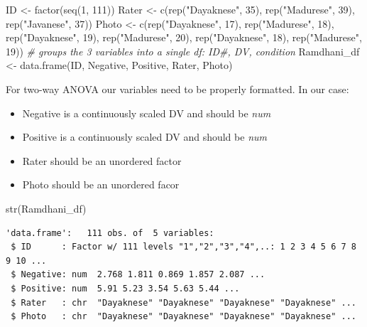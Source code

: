 \documentclass[
  11pt,
]{book}
\newenvironment{Shaded}{\begin{snugshade}}{\end{snugshade}}
\newcommand{\CommentTok}[1]{\textcolor[rgb]{0.56,0.35,0.01}{\textit{#1}}}
\newcommand{\DecValTok}[1]{\textcolor[rgb]{0.00,0.00,0.81}{#1}}
\newcommand{\FunctionTok}[1]{\textcolor[rgb]{0.00,0.00,0.00}{#1}}
\newcommand{\NormalTok}[1]{#1}
\newcommand{\OtherTok}[1]{\textcolor[rgb]{0.56,0.35,0.01}{#1}}
\newcommand{\StringTok}[1]{\textcolor[rgb]{0.31,0.60,0.02}{#1}}
\providecommand{\tightlist}{%
  \setlength{\itemsep}{0pt}\setlength{\parskip}{0pt}}
\begin{document}
\begin{Shaded}
\begin{Highlighting}[]
\NormalTok{ID }\OtherTok{\textless{}{-}} \FunctionTok{factor}\NormalTok{(}\FunctionTok{seq}\NormalTok{(}\DecValTok{1}\NormalTok{, }\DecValTok{111}\NormalTok{))}
\NormalTok{Rater }\OtherTok{\textless{}{-}} \FunctionTok{c}\NormalTok{(}\FunctionTok{rep}\NormalTok{(}\StringTok{"Dayaknese"}\NormalTok{, }\DecValTok{35}\NormalTok{), }\FunctionTok{rep}\NormalTok{(}\StringTok{"Madurese"}\NormalTok{, }\DecValTok{39}\NormalTok{), }\FunctionTok{rep}\NormalTok{(}\StringTok{"Javanese"}\NormalTok{, }\DecValTok{37}\NormalTok{))}
\NormalTok{Photo }\OtherTok{\textless{}{-}} \FunctionTok{c}\NormalTok{(}\FunctionTok{rep}\NormalTok{(}\StringTok{"Dayaknese"}\NormalTok{, }\DecValTok{17}\NormalTok{), }\FunctionTok{rep}\NormalTok{(}\StringTok{"Madurese"}\NormalTok{, }\DecValTok{18}\NormalTok{), }\FunctionTok{rep}\NormalTok{(}\StringTok{"Dayaknese"}\NormalTok{,}
    \DecValTok{19}\NormalTok{), }\FunctionTok{rep}\NormalTok{(}\StringTok{"Madurese"}\NormalTok{, }\DecValTok{20}\NormalTok{), }\FunctionTok{rep}\NormalTok{(}\StringTok{"Dayaknese"}\NormalTok{, }\DecValTok{18}\NormalTok{), }\FunctionTok{rep}\NormalTok{(}\StringTok{"Madurese"}\NormalTok{, }\DecValTok{19}\NormalTok{))}
\CommentTok{\# groups the 3 variables into a single df: ID\#, DV, condition}
\NormalTok{Ramdhani\_df }\OtherTok{\textless{}{-}} \FunctionTok{data.frame}\NormalTok{(ID, Negative, Positive, Rater, Photo)}
\end{Highlighting}
\end{Shaded}

For two-way ANOVA our variables need to be properly formatted. In our case:

\begin{itemize}
\tightlist
\item
  Negative is a continuously scaled DV and should be \emph{num}
\item
  Positive is a continuously scaled DV and should be \emph{num}
\item
  Rater should be an unordered factor
\item
  Photo should be an unordered facor
\end{itemize}

\begin{Shaded}
\begin{Highlighting}[]
\FunctionTok{str}\NormalTok{(Ramdhani\_df)}
\end{Highlighting}
\end{Shaded}

\begin{verbatim}
'data.frame':   111 obs. of  5 variables:
 $ ID      : Factor w/ 111 levels "1","2","3","4",..: 1 2 3 4 5 6 7 8 9 10 ...
 $ Negative: num  2.768 1.811 0.869 1.857 2.087 ...
 $ Positive: num  5.91 5.23 3.54 5.63 5.44 ...
 $ Rater   : chr  "Dayaknese" "Dayaknese" "Dayaknese" "Dayaknese" ...
 $ Photo   : chr  "Dayaknese" "Dayaknese" "Dayaknese" "Dayaknese" ...
\end{verbatim}
\end{document}
